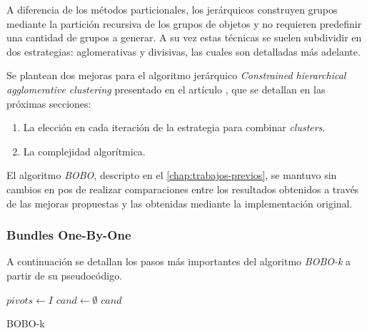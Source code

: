 A diferencia de los métodos particionales, los jerárquicos construyen grupos mediante la partición recursiva de los grupos de objetos y no requieren predefinir una cantidad de grupos a generar. A su vez estas técnicas se suelen subdividir en dos estrategias: aglomerativas y divisivas, las cuales son detalladas más adelante.

Se plantean dos mejoras para el algoritmo jerárquico \textit{Constrained hierarchical agglomerative clustering} presentado en el artículo \cite{journals/tkde/Amer-YahiaBCFMZ14}, que se detallan en las próximas secciones:
\begin{enumerate}
	\item La elección en cada iteración de la estrategia para combinar \textit{clusters}.
	\item La complejidad algorítmica.
\end{enumerate}

El algoritmo \textit{BOBO}, descripto en el \autoref{chap:trabajos-previos}, se mantuvo sin cambios en pos de realizar comparaciones entre los resultados obtenidos a través de las mejoras propuestas y las obtenidas mediante la implementación original.

\subsubsection{Bundles One-By-One}
A continuación se detallan los pasos más importantes del algoritmo \textit{BOBO-k} a partir de su pseudocódigo.

\begin{center}
	\begin{algorithm}[H]
	\DontPrintSemicolon
	\SetAlgoLined
		$pivots \leftarrow I$\;
		$cand \leftarrow \emptyset$\;
		\Return $cand$\;
	\caption{BOBO-k}\label{alg:bobo}
	\end{algorithm}
\end{center}

